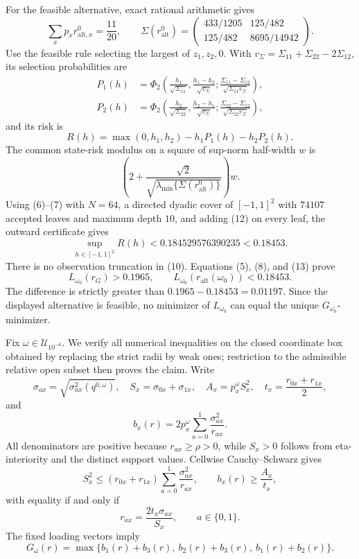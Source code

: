 For the feasible alternative, exact rational arithmetic gives
\[
 \sum_xp_xr^0_{\mathrm{alt},x}=\frac{11}{20},\qquad
 \Sigma(r^0_{\mathrm{alt}})=
 \begin{pmatrix}433/1205&125/482\\125/482&8695/14942\end{pmatrix}. \tag{9}
\]
Use the feasible rule selecting the largest of \(z_1,z_2,0\).  With \(v_\Sigma=\Sigma_{11}+\Sigma_{22}-2\Sigma_{12}\), its selection probabilities are
\[
 \begin{aligned}
 P_1(h)&=\Phi_2\!\left(\frac{h_1}{\sqrt{\Sigma_{11}}},
 \frac{h_1-h_2}{\sqrt{v_\Sigma}};
 \frac{\Sigma_{11}-\Sigma_{12}}{\sqrt{\Sigma_{11}v_\Sigma}}\right),\\
 P_2(h)&=\Phi_2\!\left(\frac{h_2}{\sqrt{\Sigma_{22}}},
 \frac{h_2-h_1}{\sqrt{v_\Sigma}};
 \frac{\Sigma_{22}-\Sigma_{12}}{\sqrt{\Sigma_{22}v_\Sigma}}\right),
 \end{aligned}                                                       \tag{10}
\]
and its risk is
\[
 R(h)=\max(0,h_1,h_2)-h_1P_1(h)-h_2P_2(h).                           \tag{11}
\]
The common state-risk modulus on a square of sup-norm half-width \(w\) is
\[
 \left(2+\frac{\sqrt2}{\sqrt{\lambda_{\min}\{\Sigma(r^0_{\mathrm{alt}})\}}}\right)w. \tag{12}
\]
Using (6)--(7) with \(N=64\), a directed dyadic cover of \([-1,1]^2\) with \(74107\) accepted leaves and maximum depth \(10\), and adding (12) on every leaf, the outward certificate gives
\[
 \sup_{h\in[-1,1]^2}R(h)<0.184529576390235<0.18453.                 \tag{13}
\]
There is no observation truncation in (10).  Equations (5), (8), and (13) prove
\[
 L_{\omega_0}(r_G)>0.1965,\qquad
 L_{\omega_0}(r_{\mathrm{alt}}(\omega_0))<0.18453.
\]
The difference is strictly greater than \(0.1965-0.18453=0.01197\).  Since the displayed alternative is feasible, no minimizer of \(L_{\omega_0}\) can equal the unique \(G_{\omega_0}\)-minimizer.

Fix \(\omega\in\mathcal U_{10^{-6}}\).  We verify all numerical inequalities on the closed coordinate box obtained by replacing the strict radii by weak ones; restriction to the admissible relative open subset then proves the claim.  Write
\[
 \sigma_{ax}=\sqrt{\sigma^2_{ax}(q^{0,\omega})},\quad
 S_x=\sigma_{0x}+\sigma_{1x},\quad A_x=p_x^\omega S_x^2,\quad
 t_x=\frac{r_{0x}+r_{1x}}2,
\]
and
\[
 b_x(r)=2p_x^\omega\sum_{a=0}^1\frac{\sigma_{ax}^2}{r_{ax}}.
\]
All denominators are positive because \(r_{ax}\geq\rho>0\), while \(S_x>0\) follows from eta-interiority and the distinct support values.  Cellwise Cauchy--Schwarz gives
\[
 S_x^2
 \leq(r_{0x}+r_{1x})\sum_{a=0}^1\frac{\sigma_{ax}^2}{r_{ax}},\qquad
 b_x(r)\geq\frac{A_x}{t_x},                                        \tag{1}
\]
with equality if and only if
\[
 r_{ax}=\frac{2t_x\sigma_{ax}}{S_x},\qquad a\in\{0,1\}.             \tag{2}
\]
The fixed loading vectors imply
\[
 G_\omega(r)=\max\{b_1(r)+b_3(r),\ b_2(r)+b_3(r),\ b_1(r)+b_2(r)\}. \tag{3}
\]

